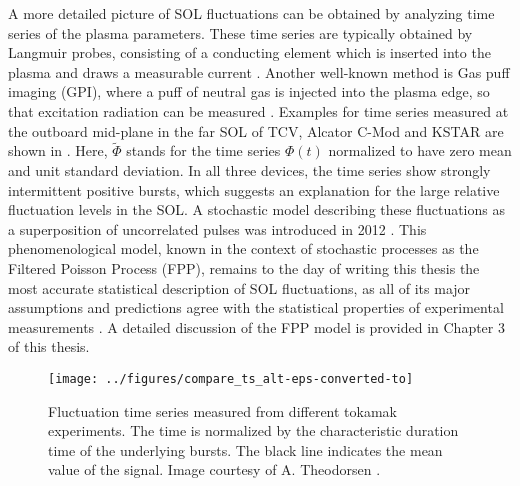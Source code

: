 A more detailed picture of SOL fluctuations can be obtained by analyzing time series of
the plasma parameters. These time series are typically obtained by Langmuir probes,
consisting of a conducting element which is inserted into the plasma and draws a
measurable current \cite{langmuir1923positive,mott1926theory}. Another well-known method
is Gas puff imaging (GPI), where a puff of neutral gas is injected into the plasma edge,
so that excitation radiation can be measured \cite{zweben2017invited}. Examples for time
series measured at the outboard mid-plane in the far SOL of TCV, Alcator C-Mod and KSTAR
are shown in . Here, $\widetilde{\Phi}$ stands for the time
series $\Phi(t)$ normalized to have zero mean and unit standard deviation. In all three
devices, the time series show strongly intermittent positive bursts, which suggests an
explanation for the large relative fluctuation levels in the SOL. A stochastic model
describing these fluctuations as a superposition of uncorrelated pulses was introduced
in 2012 \cite{garcia2012stochastic}. This phenomenological model, known in the context
of stochastic processes as the Filtered Poisson Process (FPP), remains to the day of
writing this thesis the most accurate statistical description of SOL fluctuations, as
all of its major assumptions and predictions agree with the statistical properties of
experimental measurements
\cite{garcia2013intermittent,garcia2013burst,garcia2015intermittent,kube2016fluctuation,garcia2017sol,kube2018intermittent,garcia2018intermittent,theodorsen2018universality}.
A detailed discussion of the FPP model is provided in Chapter 3 of this thesis.
\begin{figure}[t]
  \centering
  \texttt{[image: ../figures/compare\_ts\_alt-eps-converted-to]}
  \caption{Fluctuation time series measured from different tokamak experiments. The time is normalized by the characteristic duration time of the underlying bursts. The black line indicates the mean value of the signal. Image courtesy of A. Theodorsen \cite{theodorsen2018statistical}.}
  \label{Fig:time_series}
\end{figure}

